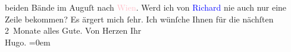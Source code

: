                     beiden Bände im Auguſt nach \textcolor{pink}{Wien}{}\ledrightnote{\textcolor{pink}{Wien}}.\pend
           \pstart
           {\pb}Werd ich von \textcolor{blue}{Richard}{}\ledrightnote{\textcolor{blue}{Richard Beer-Hofmann}} nie auch nur eine Zeile
                    bekommen?\pend
           \pstart
           Es ärgert mich ſehr.\pend
           \pstart
           Ich wünſche Ihnen für die nächſten 2 Monate alles Gute.\pend
           \pstart
           Von Herzen Ihr{\\[\baselineskip]}\spacefill\mbox{Hugo.}\pend
           \leftskip=0em{}\endnumbering{}  
      